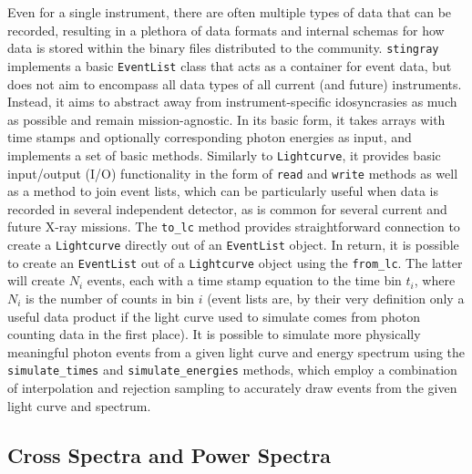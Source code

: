 \documentclass[twocolumn]{aastex62}
\newcommand{\stingray}{\texttt{stingray}\xspace}
\newcommand{\lightcurve}{\texttt{Lightcurve}\xspace}
\newcommand{\eventlist}{\texttt{EventList}\xspace}
\begin{document}
Even for a single instrument, there are often multiple types of data that can be recorded, resulting in a plethora of data formats and internal schemas for how data is stored within the binary files distributed to the community. \stingray implements a basic \eventlist class that acts as a container for event data, but does not aim to encompass all data types of all current (and future) instruments. Instead, it aims to abstract away from instrument-specific idosyncrasies as much as possible and remain mission-agnostic. In its basic form, it takes arrays with time stamps and optionally corresponding photon energies as input, and implements a set of basic methods. Similarly to \lightcurve, it provides basic input/output (I/O) functionality in the form of \texttt{read} and \texttt{write} methods as well as a method to join event lists, which can be particularly useful when data is recorded in several independent detector, as is common for several current and future X-ray missions. The \verb|to_lc| method provides straightforward connection to create a \lightcurve directly out of an \eventlist object. In return, it is possible to create an \eventlist out of a \lightcurve object using the \verb|from_lc|. The latter will create $N_i$ events, each with a time stamp equation to the time bin $t_i$, where $N_i$ is the number of counts in bin $i$ (event lists are, by their very definition only a useful data product if the light curve used to simulate comes from photon counting data in the first place). 
It is possible to simulate more physically meaningful photon events from a given light curve and energy spectrum using the \verb|simulate_times| and \verb|simulate_energies| methods, which employ a combination of interpolation and rejection sampling to accurately draw events from the given light curve and spectrum.


\subsection{Cross Spectra and Power Spectra}
\label{sec:csps}
\end{document}
